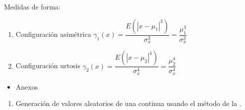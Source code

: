 Medidas de forma:
\begin{enumerate}[label=\color{lightblue}\arabic*)]
	\item Configuración asimétrica $\gamma_1(x)=\dfrac{E(|x-\mu_1|^3)}{\sigma_x^3}=\dfrac{\mu_1^3}{\sigma_x^3}$
	\item Configuración urtosis $\gamma_2(x)=\dfrac{E(|x-\mu_2|^4)}{\sigma_x^4}=\dfrac{\mu_2^4}{\sigma_x^4}$
\end{enumerate}
\begin{itemize}[label=\color{red}\textbullet, leftmargin=*]
	\item \color{lightblue}Anexos
\end{itemize}
\begin{enumerate}[label=\color{red}\arabic*), leftmargin=*]
	\item {}
	
	Generación de valores aleatorios de una \va continua usando el método de la .
	

\end{enumerate}
